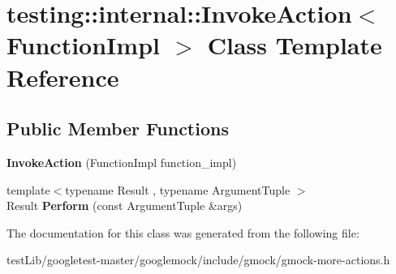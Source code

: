 \hypertarget{classtesting_1_1internal_1_1InvokeAction}{}\section{testing\+:\+:internal\+:\+:Invoke\+Action$<$ Function\+Impl $>$ Class Template Reference}
\label{classtesting_1_1internal_1_1InvokeAction}
\subsection*{Public Member Functions}
\begin{DoxyCompactItemize}
\item 
\mbox{\label{classtesting_1_1internal_1_1InvokeAction_a786ce772624fc87a31891f465df7ce61}} 
{\bfseries Invoke\+Action} (Function\+Impl function\+\_\+impl)
\item 
\mbox{\label{classtesting_1_1internal_1_1InvokeAction_af357ce691795b3520de1fda4ab8af8b2}} 
{\footnotesize template$<$typename Result , typename Argument\+Tuple $>$ }\\Result {\bfseries Perform} (const Argument\+Tuple \&args)
\end{DoxyCompactItemize}


The documentation for this class was generated from the following file\+:\begin{DoxyCompactItemize}
\item 
test\+Lib/googletest-\/master/googlemock/include/gmock/gmock-\/more-\/actions.\+h\end{DoxyCompactItemize}
